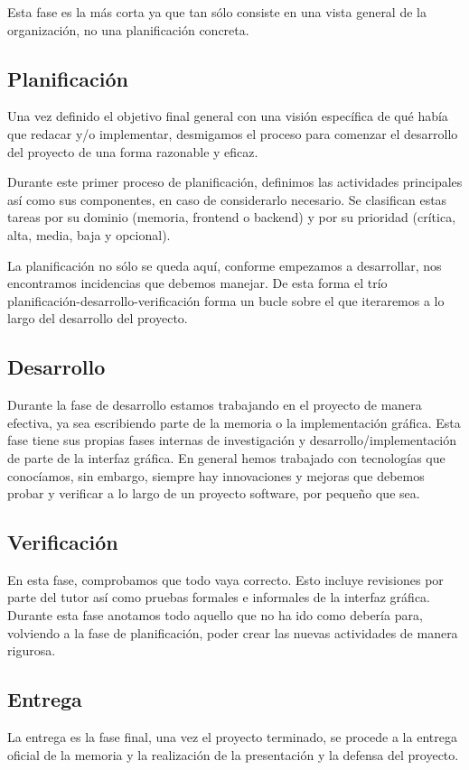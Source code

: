 Esta fase es la más corta ya que tan sólo consiste en una vista general de la organización, no una planificación concreta.

\subsection{Planificación}

Una vez definido el objetivo final general con una visión específica de qué había que redacar y/o implementar, desmigamos el proceso para comenzar el desarrollo del proyecto de una forma razonable y eficaz.

Durante este primer proceso de planificación, definimos las actividades principales así como sus componentes, en caso de considerarlo necesario. Se clasifican estas tareas por su dominio (memoria, frontend o backend) y por su prioridad (crítica, alta, media, baja y opcional).

La planificación no sólo se queda aquí, conforme empezamos a desarrollar, nos encontramos incidencias que debemos manejar. De esta forma el trío planificación-desarrollo-verificación forma un bucle sobre el que iteraremos a lo largo del desarrollo del proyecto.

\subsection{Desarrollo}

Durante la fase de desarrollo estamos trabajando en el proyecto de manera efectiva, ya sea escribiendo parte de la memoria o la implementación gráfica. Esta fase tiene sus propias fases internas de investigación y desarrollo/implementación de parte de la interfaz gráfica. En general hemos trabajado con tecnologías que conocíamos, sin embargo, siempre hay innovaciones y mejoras que debemos probar y verificar a lo largo de un proyecto software, por pequeño que sea.

\subsection{Verificación}

En esta fase, comprobamos que todo vaya correcto. Esto incluye revisiones por parte del tutor así como pruebas formales e informales de la interfaz gráfica. Durante esta fase anotamos todo aquello que no ha ido como debería para, volviendo a la fase de planificación, poder crear las nuevas actividades de manera rigurosa.

\subsection{Entrega}

La entrega es la fase final, una vez el proyecto terminado, se procede a la entrega oficial de la memoria y la realización de la presentación y la defensa del proyecto.